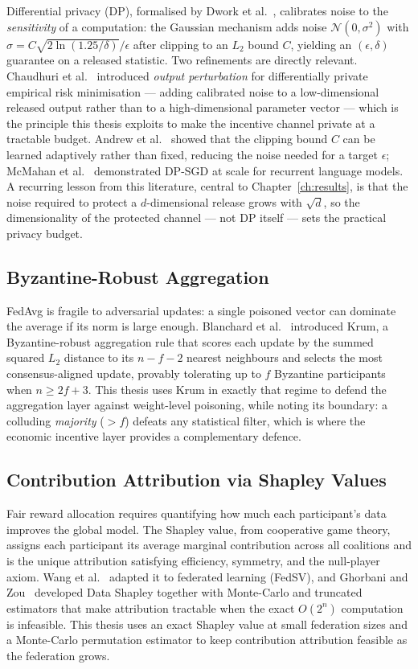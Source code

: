 Differential privacy (DP), formalised by Dwork et al.~\cite{dwork2006}, calibrates noise to the \emph{sensitivity} of a computation: the Gaussian mechanism adds noise $\mathcal{N}(0,\sigma^2)$ with $\sigma = C\sqrt{2\ln(1.25/\delta)}/\epsilon$ after clipping to an $L_2$ bound $C$, yielding an $(\epsilon,\delta)$ guarantee on a released statistic. Two refinements are directly relevant. Chaudhuri et al.~\cite{chaudhuri2011} introduced \emph{output perturbation} for differentially private empirical risk minimisation --- adding calibrated noise to a low-dimensional released output rather than to a high-dimensional parameter vector --- which is the principle this thesis exploits to make the incentive channel private at a tractable budget. Andrew et al.~\cite{andrew2021} showed that the clipping bound $C$ can be learned adaptively rather than fixed, reducing the noise needed for a target $\epsilon$; McMahan et al.~\cite{mcmahan2018} demonstrated DP-SGD at scale for recurrent language models. A recurring lesson from this literature, central to Chapter~\ref{ch:results}, is that the noise required to protect a $d$-dimensional release grows with $\sqrt{d}$, so the dimensionality of the protected channel --- not DP itself --- sets the practical privacy budget.

\subsection{Byzantine-Robust Aggregation}

FedAvg is fragile to adversarial updates: a single poisoned vector can dominate the average if its norm is large enough. Blanchard et al.~\cite{blanchard2017} introduced Krum, a Byzantine-robust aggregation rule that scores each update by the summed squared $L_2$ distance to its $n-f-2$ nearest neighbours and selects the most consensus-aligned update, provably tolerating up to $f$ Byzantine participants when $n \ge 2f+3$. This thesis uses Krum in exactly that regime to defend the aggregation layer against weight-level poisoning, while noting its boundary: a colluding \emph{majority} ($>f$) defeats any statistical filter, which is where the economic incentive layer provides a complementary defence.

\subsection{Contribution Attribution via Shapley Values}

Fair reward allocation requires quantifying how much each participant's data improves the global model. The Shapley value, from cooperative game theory, assigns each participant its average marginal contribution across all coalitions and is the unique attribution satisfying efficiency, symmetry, and the null-player axiom. Wang et al.~\cite{wang2020fedsv} adapted it to federated learning (FedSV), and Ghorbani and Zou~\cite{ghorbani2019} developed Data Shapley together with Monte-Carlo and truncated estimators that make attribution tractable when the exact $O(2^n)$ computation is infeasible. This thesis uses an exact Shapley value at small federation sizes and a Monte-Carlo permutation estimator to keep contribution attribution feasible as the federation grows.


